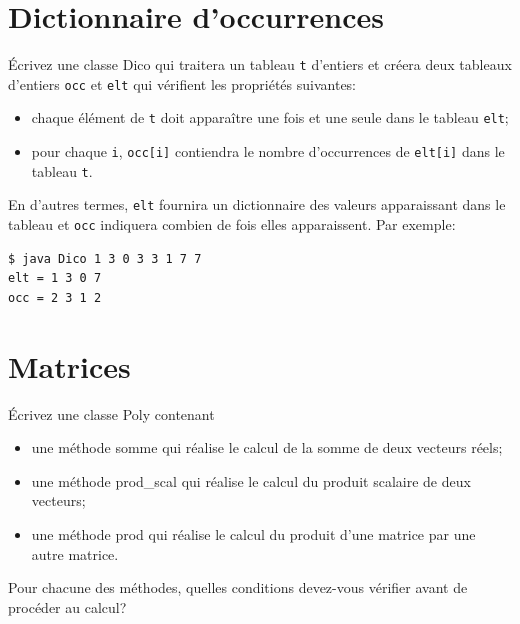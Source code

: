 \documentclass[11pt,a4paper]{article}
\newcommand{\bitem}{\item[$\bullet$]}
\begin{document}
\section{Dictionnaire d'occurrences}

Écrivez une classe \textsf{Dico} qui traitera un tableau \texttt{t}
d'entiers et créera deux tableaux d'entiers \texttt{occ} et
\texttt{elt} qui vérifient les propriétés suivantes:

\begin{itemize}

  \bitem chaque élément de \texttt{t} doit apparaître une fois et une
  seule dans le tableau \texttt{elt};

  \bitem pour chaque \texttt{i}, \texttt{occ[i]} contiendra le nombre
  d'occurrences de \texttt{elt[i]} dans le tableau \texttt{t}.

\end{itemize}

En d'autres termes, \texttt{elt} fournira un dictionnaire des valeurs
apparaissant dans le tableau et \texttt{occ} indiquera combien de fois
elles apparaissent. Par exemple:
{\small
\begin{verbatim}
$ java Dico 1 3 0 3 3 1 7 7
elt = 1 3 0 7
occ = 2 3 1 2
\end{verbatim}
}


\section{Matrices}

\noindent Écrivez une classe \textsf{Poly} contenant

\begin{itemize}

  \bitem une méthode \textsf{somme} qui réalise le calcul de la somme
  de deux vecteurs réels;

  \bitem une méthode \textsf{prod\_scal} qui réalise le calcul du
  produit scalaire de deux vecteurs;

  \bitem une méthode \textsf{prod} qui réalise le calcul du produit
  d'une matrice par une autre matrice.

\end{itemize}

Pour chacune des méthodes, quelles conditions devez-vous vérifier
avant de procéder au calcul?
\end{document}
